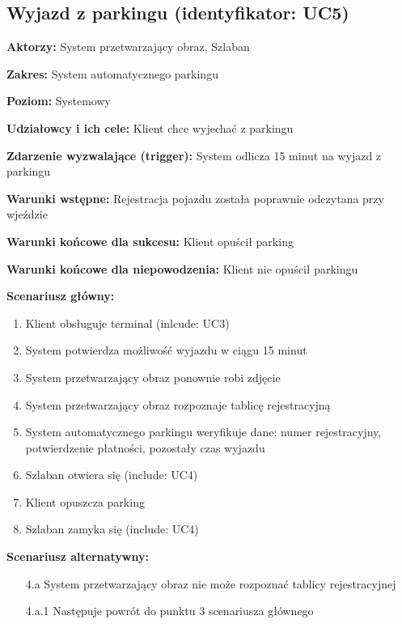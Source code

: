 \subsection{Wyjazd z parkingu (identyfikator: UC5)}
\textbf{Aktorzy: }System przetwarzający obraz, Szlaban

\hspace{0cm}\textbf{Zakres: }System automatycznego parkingu

\hspace{0cm}\textbf{Poziom: }Systemowy

\hspace{0cm}\textbf{Udziałowcy i ich cele: }Klient chce wyjechać z parkingu

\hspace{0cm}\textbf{Zdarzenie wyzwalające (trigger): } System odlicza 15 minut na wyjazd z parkingu

\hspace{0cm}\textbf{Warunki wstępne: }
Rejestracja pojazdu została poprawnie odczytana przy wjeździe

\hspace{0cm}\textbf{Warunki końcowe dla sukcesu: }Klient opuścił parking

\hspace{0cm}\textbf{Warunki końcowe dla niepowodzenia: }Klient nie opuścił parkingu \newline

\hspace{0cm}\textbf{Scenariusz główny: }
\begin{enumerate}
\item Klient obsługuje terminal (inlcude: UC3)
\item System potwierdza możliwość wyjazdu w ciągu 15 minut
\item System przetwarzający obraz ponownie robi zdjęcie
\item System przetwarzający obraz rozpoznaje tablicę rejestracyjną
\item System automatycznego parkingu weryfikuje dane: numer rejestracyjny, potwierdzenie płatności, pozostały czas wyjazdu
\item Szlaban otwiera się (include: UC4)
\item Klient opuszcza parking
\item Szlaban zamyka się (include: UC4)
\end{enumerate}
\hspace{0cm}\textbf{Scenariusz alternatywny: }
\begin{enumerate}
\item[4.a] System przetwarzający obraz nie może rozpoznać tablicy rejestracyjnej
\item[4.a.1] Następuje powrót do punktu 3 scenariusza głównego
\end{enumerate}

